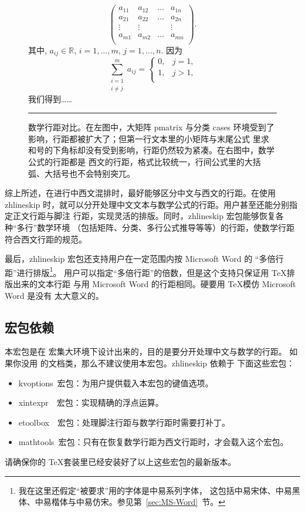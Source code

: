 \documentclass[zihao=5,a4paper]{ctexart}
\newcommand\pkg[1]{{\normalfont\ttfamily#1}}
\newcommand\env[1]{{\normalfont\ttfamily#1}}
\newcommand*\packagedependency[1]{%
  \mbox{\pkg{#1}~宏包：}}
\begin{document}
\begin{figure}[h]
\begin{minipage}[t]{162pt}
\[\begin{pmatrix}
a_{11} & a_{12} & \dotsc & a_{1n} \\
a_{21} & a_{22} & \dotsc & a_{2n} \\
\vdots & \vdots &        & \vdots \\
a_{m1} & a_{m2} & \dotsc & a_{mn} \\
\end{pmatrix}.
\]
其中, $a_{ij} \in \mathbb{R}$, $i=1,\dotsc,m$, $j=1,\dotsc,n$.
因为
\[
\sum_{\substack{i=1\\i\neq j}}^m a_{ij} = \begin{cases}
0, & j=1,\\
1, & j>1,\\
\end{cases}
\]
我们得到……
\end{minipage}\quad
\rule[\dimexpr-\dp0-0.5em\relax]{0.4pt}{\dimexpr{}++1em\relax}%
%
\caption[数学行距对比]{数学行距对比。在左图中，大矩阵 \env{pmatrix} 与分类
  \env{cases} 环境受到了影响，行距都被扩大了；但第一行文本里的小矩阵与末尾公式
  里求和号的下角标却没有受到影响，行距仍然较为紧凑。在右图中，数学公式的行距都是
  西文的行距，格式比较统一，行间公式里的大括弧、大括号也不会特别突兀。}
\label{fig:math-leading}
\end{figure}

综上所述，在进行中西文混排时，最好能够区分中文与西文的行距。在使用 \pkg{zhlineskip}
时，就可以分开处理中文文本与数学公式的行距。用户甚至还能分别指定正文行距与脚注
行距，实现灵活的排版。同时，\pkg{zhlineskip} 宏包能够恢复各种“多行”数学环境
（包括矩阵、分类、多行公式推导等等）的行距，使数学行距符合西文行距的规范。

最后，\pkg{zhlineskip} 宏包还支持用户在一定范围内按 Microsoft Word 的
“多倍行距”进行排版\footnote{我在这里还假定“被要求”用的字体是中易系列字体，
这包括中易宋体、中易黑体、中易楷体与中易仿宋。参见第~\ref{sec:MS-Word}~节。}。
用户可以指定“多倍行距”的倍数，但是这个支持只保证用 \TeX 排版出来的文本行距
与用 Microsoft Word 的行距相同。硬要用 \TeX 模仿 Microsoft Word 是没有
太大意义的。

\subsection{宏包依赖}

本宏包是在 \CTeX 宏集大环境下设计出来的，目的是要分开处理中文与数学的行距。
如果你没用 \CTeX 的文档类，那么不建议使用本宏包。\pkg{zhlineskip} 依赖于
下面这些宏包：
\begin{itemize}[noitemsep]
\item \packagedependency{kvoptions}为用户提供载入本宏包的键值选项。
\item \packagedependency{xintexpr~}实现精确的浮点运算。
\item \packagedependency{etoolbox~}处理脚注行距与数学行距时需要打补丁。
\item \packagedependency{mathtools}只有在恢复数学行距为西文行距时，才会载入这个宏包。
\end{itemize}
请确保你的 \TeX 套装里已经安装好了以上这些宏包的最新版本。
\end{document}
